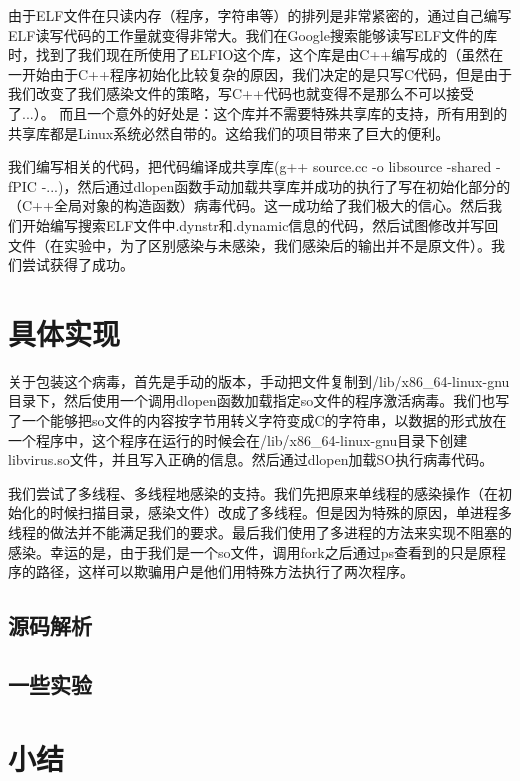 \documentclass[11pt]{article}
\begin{document}
由于ELF文件在只读内存（程序，字符串等）的排列是非常紧密的，通过自己编写ELF读写代码的工作量就变得非常大。我们在Google搜索能够读写ELF文件的库时，找到了我们现在所使用了ELFIO这个库，这个库是由C++编写成的（虽然在一开始由于C++程序初始化比较复杂的原因，我们决定的是只写C代码，但是由于我们改变了我们感染文件的策略，写C++代码也就变得不是那么不可以接受了...）。 而且一个意外的好处是：这个库并不需要特殊共享库的支持，所有用到的共享库都是Linux系统必然自带的。这给我们的项目带来了巨大的便利。

我们编写相关的代码，把代码编译成共享库(g++ source.cc -o libsource -shared -fPIC -...)，然后通过dlopen函数手动加载共享库并成功的执行了写在初始化部分的（C++全局对象的构造函数）病毒代码。这一成功给了我们极大的信心。然后我们开始编写搜索ELF文件中.dynstr和.dynamic信息的代码，然后试图修改并写回文件（在实验中，为了区别感染与未感染，我们感染后的输出并不是原文件）。我们尝试获得了成功。

\section{具体实现}
关于包装这个病毒，首先是手动的版本，手动把文件复制到/lib/x86\_64-linux-gnu目录下，然后使用一个调用dlopen函数加载指定so文件的程序激活病毒。我们也写了一个能够把so文件的内容按字节用转义字符变成C的字符串，以数据的形式放在一个程序中，这个程序在运行的时候会在/lib/x86\_64-linux-gnu目录下创建libvirus.so文件，并且写入正确的信息。然后通过dlopen加载SO执行病毒代码。

我们尝试了多线程、多线程地感染的支持。我们先把原来单线程的感染操作（在初始化的时候扫描目录，感染文件）改成了多线程。但是因为特殊的原因，单进程多线程的做法并不能满足我们的要求。最后我们使用了多进程的方法来实现不阻塞的感染。幸运的是，由于我们是一个so文件，调用fork之后通过ps查看到的只是原程序的路径，这样可以欺骗用户是他们用特殊方法执行了两次程序。

\subsection{源码解析}

\subsection{一些实验}
\section{小结}
\end{document}
